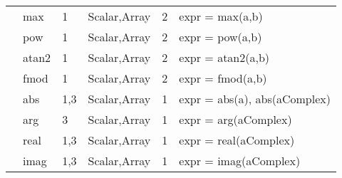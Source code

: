 \begin{center}
\begin{tabular}{|l|l|l|l|l|l}
                  &    max      &   1          &   Scalar,Array   &   2   &   expr = max(a,b) \\
                  &    pow      &   1          &   Scalar,Array   &   2   &   expr = pow(a,b) \\
                  &    atan2    &   1          &   Scalar,Array   &   2   &   expr = atan2(a,b) \\
                  &    fmod     &   1          &   Scalar,Array   &   2   &   expr = fmod(a,b) \\
                  &    abs      &   1,3        &   Scalar,Array   &   1   &   expr = abs(a), abs(aComplex) \\
                  &    arg      &   3          &   Scalar,Array   &   1   &   expr = arg(aComplex) \\
                  &    real     &   1,3        &   Scalar,Array   &   1   &   expr = real(aComplex) \\
                  &    imag     &   1,3        &   Scalar,Array   &   1   &   expr = imag(aComplex) \\
\hline
\end{tabular}
\end{center}
 

